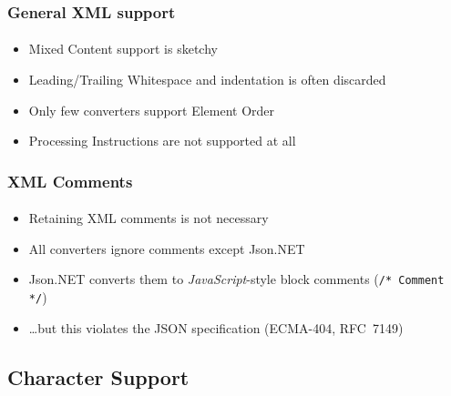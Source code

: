 \documentclass[
    alternativetitlepage=alternativ,
    cornerlogo=hgi_nds_logo2,
    sectionoverview,
]{rubpresentation}
\begin{document}
\begin{frame}
  \frametitle{General XML support}
  \framesubtitle{}
  \begin{itemize}
    \item{} Mixed Content support is sketchy
    \item{} Leading/Trailing Whitespace and indentation is often discarded
    \item{} Only few converters support Element Order
    \item{} Processing Instructions are not supported at all
  \end{itemize}
\end{frame}

\begin{frame}
  \frametitle{XML Comments}
  \framesubtitle{}
  \begin{itemize}
    \item{} Retaining XML comments is not necessary
    \item{} All converters ignore comments except Json.NET
    \item{} Json.NET converts them to \emph{JavaScript}-style block comments (\texttt{/* Comment */})
    \item{} \dots{}but this violates the JSON specification (ECMA-404, RFC~7149)
  \end{itemize}
\end{frame}

\subsection{Character Support}

\begingroup
  \begin{frame}[fragile]
    \vspace{-1.15cm}
    \begin{center}
      
    \end{center}
  \end{frame}
\endgroup

\begingroup
  \begin{frame}[fragile]
    \vspace{-1.15cm}
    \begin{center}
      
    \end{center}
  \end{frame}
\endgroup
\end{document}
